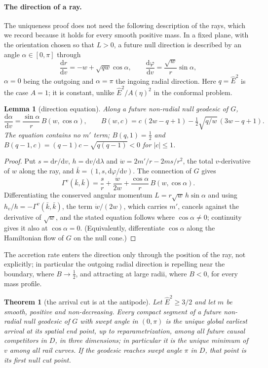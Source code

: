 \documentclass[aip,jmp,amsmath,amssymb,reprint]{revtex4-2}
\newcommand{\Ehat}{\hat E}
\newcommand{\dd}{\mathrm{d}}
\theoremstyle{plain}
\newtheorem{theorem}{Theorem}
\newtheorem{lemma}[proposition]{Lemma}
\theoremstyle{definition}
\begin{document}
\paragraph{The direction of a ray.} The uniqueness proof does not need the following description
of the rays, which we record because it holds for every smooth positive mass. In a fixed plane,
with the orientation chosen so that $L>0$, a future null direction is described by an angle
$\alpha\in[0,\pi]$ through
\begin{equation}
  \frac{\dd r}{\dd v}=-w+\sqrt{qw}\cos\alpha,\qquad
  \frac{\dd\varphi}{\dd v}=\frac{\sqrt w}{r}\sin\alpha ,
  \label{eq:vaidya-alpha}
\end{equation}
$\alpha=0$ being the outgoing and $\alpha=\pi$ the ingoing radial direction. Here $q=\Ehat^2$ is the
case $A=1$; it is constant, unlike $\Ehat^2/A(\eta)^2$ in the conformal problem.

\begin{lemma}[direction equation]\label{lem:vaidya-direction}
Along a future non-radial null geodesic of $G$,
\[
  \frac{\dd\alpha}{\dd v}=\frac{\sin\alpha}{r}\,B(w,\cos\alpha),\qquad
  B(w,c)=c\,(2w-q+1)-\tfrac12\sqrt{q/w}\,(3w-q+1).
\]
The equation contains no $m'$ term; $B(q,1)=\tfrac12$ and
$B(q-1,c)=(q-1)c-\sqrt{q(q-1)}<0$ for $|c|\le1$.
\end{lemma}

\begin{proof}
Put $s=\dd r/\dd v$, $h=\dd v/\dd\lambda$ and $\dot w=2m'/r-2ms/r^2$, the total $v$-derivative of $w$
along the ray, and $\bar k=(1,s,\dd\varphi/\dd v)$. The connection of $G$ gives
\[
  \Gamma^v(\bar k,\bar k)=\frac{s}{r}+\frac{\dot w}{2w}+\frac{\cos\alpha}{r}\,B(w,\cos\alpha).
\]
Differentiating the conserved angular momentum $L=r\sqrt w\,h\sin\alpha$ and using
$h_v/h=-\Gamma^v(\bar k,\bar k)$, the term $\dot w/(2w)$, which carries $m'$, cancels against the
derivative of $\sqrt w$, and the stated equation follows where $\cos\alpha\ne0$; continuity gives it
also at $\cos\alpha=0$. (Equivalently, differentiate $\cos\alpha$ along the Hamiltonian flow of $G$ on
the null cone.)
\end{proof}


The accretion rate enters the direction only through the position of the ray, not explicitly;
in particular the outgoing radial direction is repelling near the boundary, where $B\to\frac12$,
and attracting at large radii, where $B<0$, for every mass profile.

\begin{theorem}[the arrival cut is at the antipode]\label{thm:vaidya-antipodal-cut}
Let $\Ehat^2\ge3/2$ and let $m$ be smooth, positive and non-decreasing. Every compact segment of
a future non-radial null geodesic of $G$ with swept angle in $(0,\pi)$ is the unique global
earliest arrival at its spatial end point, up to reparametrization, among all future causal
competitors in $D$, in three dimensions; in particular it is the unique minimum of $v$ among
all rail curves. If the geodesic reaches swept angle $\pi$ in $D$, that point is its first null
cut point.
\end{theorem}
\end{document}
